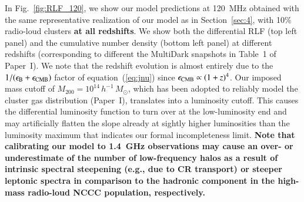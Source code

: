 \documentclass[useAMS,usenatbib]{mn2e}
\begin{document}
In Fig.~\ref{fig:RLF_120}, we show our model predictions at 120~MHz obtained
with the same representative realization of our model as in Section~\ref{sec:4},
with 10\% radio-loud clusters {\bf at all redshifts}. We show both the differential RLF (top left
panel) and the cumulative number density (bottom left panel) at different
redshifts (corresponding to different the MultiDark snapshots in Table~1 of Paper~I).  
We note that the redshift evolution is almost entirely due to the
$1/(\epsilon_{{\mathrm{B}}}+\epsilon_{{\mathrm{CMB}}})$ factor of equation~(\ref{eq:jnu})
since $\epsilon_{\mathrm{CMB}}\propto (1+z)^4$.  Our imposed mass cutoff of
$M_{200}=10^{14}\,h^{-1}\,M_\odot$, which has been adopted to reliably model the
cluster gas distribution (Paper~I), translates into a luminosity cutoff. This causes the
differential luminosity function to turn over at the low-luminosity end and may
artificially flatten the slope already at sightly higher luminosities than the
luminosity maximum that indicates our formal incompleteness limit.  
{\bf Note that calibrating our model to 1.4~GHz observations may cause an over- or
underestimate of the number of low-frequency halos as a result of intrinsic
spectral steepening (e.g., due to CR transport) or steeper leptonic spectra in
comparison to the hadronic component in the high-mass radio-loud NCCC 
population, respectively.} %
\end{document}
